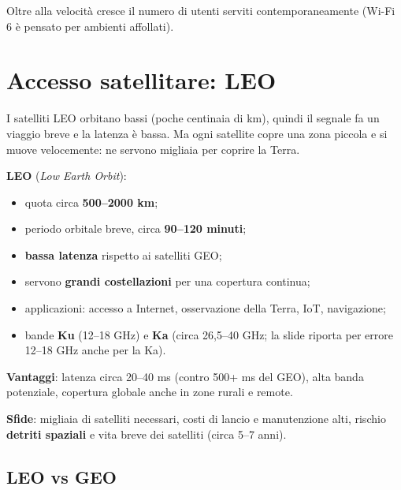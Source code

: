 Oltre alla velocità cresce il numero di utenti serviti contemporaneamente (Wi-Fi 6 è pensato per ambienti affollati).

\section{Accesso satellitare: LEO}

\begin{inbreve}

I satelliti LEO orbitano bassi (poche centinaia di km), quindi il segnale fa un viaggio breve e la latenza è bassa. Ma ogni satellite copre una zona piccola e si muove velocemente: ne servono migliaia per coprire la Terra.

\end{inbreve}

\textbf{LEO} (\emph{Low Earth Orbit}):

\begin{itemize}
\tightlist
\item
  quota circa \textbf{500--2000 km};
\item
  periodo orbitale breve, circa \textbf{90--120 minuti};
\item
  \textbf{bassa latenza} rispetto ai satelliti GEO;
\item
  servono \textbf{grandi costellazioni} per una copertura continua;
\item
  applicazioni: accesso a Internet, osservazione della Terra, IoT, navigazione;
\item
  bande \textbf{Ku} (12--18 GHz) e \textbf{Ka} (circa 26,5--40 GHz; la slide riporta per errore 12--18 GHz anche per la Ka).
\end{itemize}

\textbf{Vantaggi}: latenza circa 20--40 ms (contro 500+ ms del GEO), alta banda potenziale, copertura globale anche in zone rurali e remote.

\textbf{Sfide}: migliaia di satelliti necessari, costi di lancio e manutenzione alti, rischio \textbf{detriti spaziali} e vita breve dei satelliti (circa 5--7 anni).

\subsection{LEO vs GEO}

